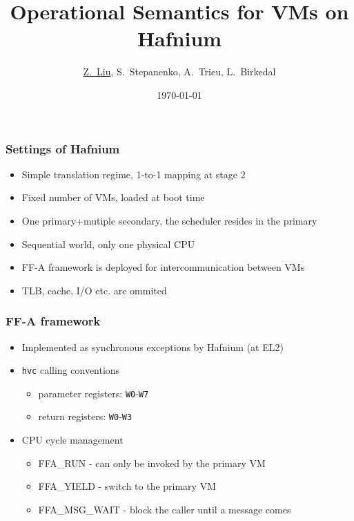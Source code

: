 \documentclass{beamer}
\title{Operational Semantics for VMs on Hafnium}
\institute{Aarhus University}
\date{\today}
\author[Liu, Stepanenko, Trieu, Birkedal]
{\underline{Z.~Liu}, S.~Stepanenko, A.~Trieu, L.~Birkedal}
\institute[Aarhus]
{
  Department of Computer Science\\
  Aarhus University
}
\begin{document}
\frame{\titlepage}

% 

\begin{frame}
  \frametitle{Settings of Hafnium}
  \begin{itemize}
    \item Simple translation regime, 1-to-1 mapping at stage 2
    \item Fixed number of VMs, loaded at boot time
    \item One primary+mutiple secondary, the scheduler resides in the primary
    \item Sequential world, only one physical CPU
    \item FF-A framework is deployed for intercommunication between VMs
    \item TLB, cache, I/O etc. are ommited
  \end{itemize}
\end{frame}

\begin{frame}
  \frametitle{FF-A framework}
  \begin{itemize}
    \item Implemented as synchronous exceptions by Hafnium (at EL2)
    \item \texttt{hvc} calling conventions
      \begin{itemize}
        \item parameter registers: \texttt{W0}-\texttt{W7}
          \item return registers: \texttt{W0}-\texttt{W3}
      \end{itemize}
    \item CPU cycle management
      \begin{itemize}
        \item FFA\_RUN - can only be invoked by the primary VM
        \item FFA\_YIELD - switch to the primary VM
        \item FFA\_MSG\_WAIT - block the caller until a message comes
      \end{itemize}

  \end{itemize}
\end{frame}
\end{document}
